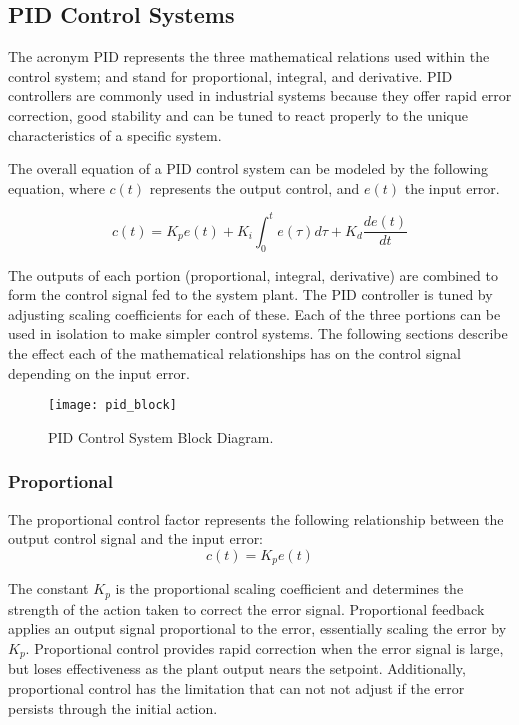 \documentclass[openany,11pt,fleqn]{book} %
\begin{document}
\subsection{PID Control Systems}
The acronym PID represents the three mathematical relations used within the control system; and stand for proportional, integral, and derivative. PID controllers are commonly used in industrial systems because they offer rapid error correction, good stability and can be tuned to react properly to the unique characteristics of a specific system.

The overall equation of a PID control system can be modeled by the following equation, where $c(t)$ represents the output control, and $e(t)$ the input error. 

    \begin{equation*}
    c(t) = K_{p}e(t) + K_{i}\int_{0}^{t}e(\tau)d\tau + K_{d}\frac{de(t)}{dt}
    \end{equation*} 

The outputs of each portion (proportional, integral, derivative) are combined to form the control signal fed to the system plant. The PID controller is tuned by adjusting scaling coefficients for each of these. Each of the three portions can be used in isolation to make simpler control systems. The following sections describe the effect each of the mathematical relationships has on the control signal depending on the input error. 


\begin{figure}[tb]
    \centering\texttt{[image: pid\_block]}
    \caption{PID Control System Block Diagram.}
    \label{pid_block}
\end{figure}

\subsubsection{Proportional}
The proportional control factor represents the following relationship between the output control signal and the input error:
\begin{equation*}
 c(t) = K_{p}e(t) 
\end{equation*} 

The constant $K_{p}$ is the proportional scaling coefficient and determines the strength of the action taken to correct the error signal. Proportional feedback applies an output signal proportional to the error, essentially scaling the error by $K_{p}$.
Proportional control provides rapid correction when the error signal is large, but loses effectiveness as the plant output nears the setpoint. Additionally, proportional control has the limitation that can not not adjust if the error persists through the initial action. 
\end{document}
